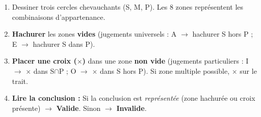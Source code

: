 \documentclass[11pt]{article}
\begin{document}
\begin{methode}
\begin{enumerate}
    \item Dessiner trois cercles chevauchants (S, M, P). Les 8 zones représentent les combinaisons d'appartenance.
    \item \textbf{Hachurer} les zones \textbf{vides} (jugements universels : A $\rightarrow$ hachurer S hors P ; E $\rightarrow$ hachurer S dans P).
    \item \textbf{Placer une croix ($\times$)} dans une zone \textbf{non vide} (jugements particuliers : I $\rightarrow$ $\times$ dans S$\cap$P ; O $\rightarrow$ $\times$ dans S hors P). Si zone multiple possible, $\times$ sur le trait.
    \item \textbf{Lire la conclusion :} Si la conclusion est \emph{représentée} (zone hachurée ou croix présente) $\rightarrow$ \textbf{Valide}. Sinon $\rightarrow$ \textbf{Invalide}.
\end{enumerate}
\end{methode}
\end{document}
